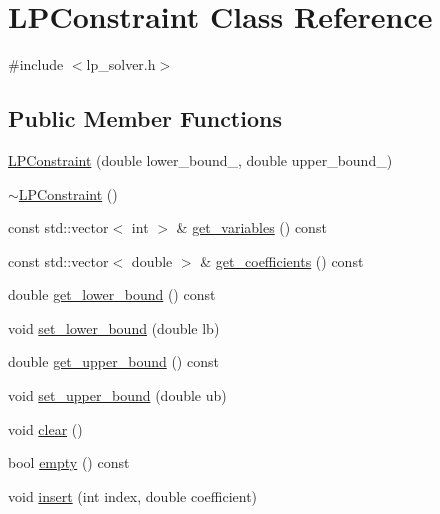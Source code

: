 \hypertarget{classLPConstraint}{\section{L\-P\-Constraint Class Reference}
\label{classLPConstraint}
}


{\ttfamily \#include $<$lp\-\_\-solver.\-h$>$}

\subsection*{Public Member Functions}
\begin{DoxyCompactItemize}
\item 
\hyperlink{classLPConstraint_a2f5f35c6f7cbd88f777c210a16bbcd03}{L\-P\-Constraint} (double lower\-\_\-bound\-\_\-, double upper\-\_\-bound\-\_\-)
\item 
\hyperlink{classLPConstraint_ad51157bbd3cdbab501e3ccc869fe14b5}{$\sim$\-L\-P\-Constraint} ()
\item 
const std\-::vector$<$ int $>$ \& \hyperlink{classLPConstraint_a0ed32ef63f2856c8e73f1cb4572d5644}{get\-\_\-variables} () const 
\item 
const std\-::vector$<$ double $>$ \& \hyperlink{classLPConstraint_a74fec7f59585a831019e45e6db78b2cc}{get\-\_\-coefficients} () const 
\item 
double \hyperlink{classLPConstraint_a6e12c32a2a69b14070fc2cab039a399f}{get\-\_\-lower\-\_\-bound} () const 
\item 
void \hyperlink{classLPConstraint_a000b78a27a35327bc9e561f304a455c2}{set\-\_\-lower\-\_\-bound} (double lb)
\item 
double \hyperlink{classLPConstraint_a52562fcd75b445a245396ae08b9090d6}{get\-\_\-upper\-\_\-bound} () const 
\item 
void \hyperlink{classLPConstraint_abac76822f118b27d008a71b3b51f48d9}{set\-\_\-upper\-\_\-bound} (double ub)
\item 
void \hyperlink{classLPConstraint_ad3f914ff283c8cb1bab0a4879cb555af}{clear} ()
\item 
bool \hyperlink{classLPConstraint_a5ebe1a4bb8bfe5fe554e064387b5e810}{empty} () const 
\item 
void \hyperlink{classLPConstraint_a07e2c6b28312597829210ca746ea4791}{insert} (int index, double coefficient)
\end{DoxyCompactItemize}


